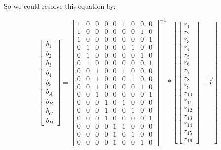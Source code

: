 \documentclass[12pt,a4paper]{article}
\begin{document}
So we could resolve this equation by:

\begin{equation}
\begin{bmatrix}
b_1\\
b_2\\
b_3\\
b_4\\
b_5\\
b_A\\
b_B\\
b_C\\
b_D
\end{bmatrix}
=
\begin{bmatrix}
 1 &  0 &  0 &  0 &  0 &  1 &  0 &  0 &  0 \\
 1 &  0 &  0 &  0 &  0 &  0 &  0 &  1 &  0 \\
 1 &  0 &  0 &  0 &  0 &  0 &  0 &  0 &  1 \\
 0 &  1 &  0 &  0 &  0 &  0 &  1 &  0 &  0 \\
 0 &  1 &  0 &  0 &  0 &  0 &  0 &  1 &  0 \\
 0 &  1 &  0 &  0 &  0 &  0 &  0 &  0 &  1 \\
 0 &  0 &  1 &  0 &  0 &  1 &  0 &  0 &  0 \\
 0 &  0 &  1 &  0 &  0 &  0 &  1 &  0 &  0 \\
 0 &  0 &  1 &  0 &  0 &  0 &  0 &  1 &  0 \\
 0 &  0 &  1 &  0 &  0 &  0 &  0 &  0 &  1 \\
 0 &  0 &  0 &  1 &  0 &  1 &  0 &  0 &  0 \\
 0 &  0 &  0 &  1 &  0 &  0 &  1 &  0 &  0 \\
 0 &  0 &  0 &  1 &  0 &  0 &  0 &  0 &  1 \\
 0 &  0 &  0 &  0 &  1 &  1 &  0 &  0 &  0 \\
 0 &  0 &  0 &  0 &  1 &  0 &  1 &  0 &  0 \\
 0 &  0 &  0 &  0 &  1 &  0 &  0 &  1 &  0
\end{bmatrix}^{-1}
*
[
\begin{bmatrix}
r_1\\
r_2\\
r_3\\
r_4\\
r_5\\
r_6\\
r_7\\
r_8\\
r_9\\
r_{10}\\
r_{11}\\
r_{12}\\
r_{13}\\
r_{14}\\
r_{15}\\
r_{16}
\end{bmatrix}
- \vec{\bar{r}}
]
\end{equation}
\end{document}
